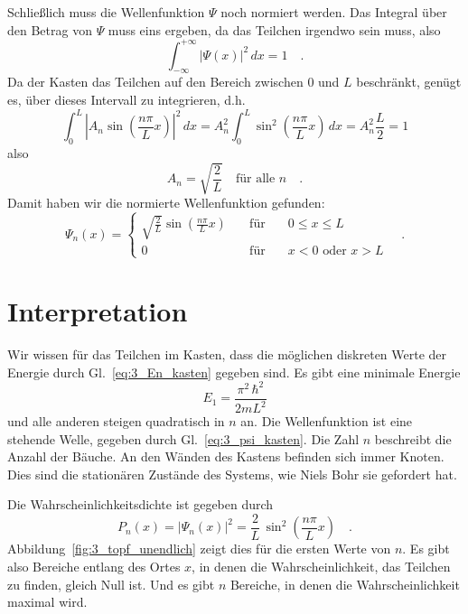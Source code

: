 Schließlich muss die Wellenfunktion $\Psi$ noch normiert werden. Das Integral über den Betrag von $\Psi$ muss eins ergeben, da das Teilchen irgendwo sein muss, also
\begin{equation}
    \int_{-\infty}^{+\infty} \left| \Psi(x) \right|^2 \,dx = 1 \quad .
\end{equation}
Da der Kasten das Teilchen auf den Bereich zwischen $0$ und $L$ beschränkt, genügt es, über dieses Intervall zu integrieren, d.h. 
\begin{equation}
    \int_0^{L} \left|  A_n \sin \left(  \frac{n\pi}{L} x \right) \right|^2 \,dx =
   A_n^2  \int_0^{L} \sin^2 \left(  \frac{n\pi}{L} x \right)  \,dx = 
   A_n^2  \frac{L}{2} = 1
\end{equation}
also
\begin{equation}
    A_n = \sqrt{\frac{2}{L}} \quad \text{für alle }n \quad .
\end{equation}
Damit haben wir die normierte Wellenfunktion gefunden:
\begin{equation}
    \Psi_n(x) = \left\{
    \begin{matrix}
        \sqrt{\frac{2}{L}}  \sin \left(  \frac{n\pi}{L} x \right) \quad &\text{für} \quad & 0 \le x \le L \\
        0  &  \text{für} &  x < 0 \text{ oder } x > L 
    \end{matrix}
    \right. \quad .
    \label{eq:3_psi_kasten}
\end{equation}

\section{Interpretation}

Wir wissen  für das Teilchen im Kasten, dass die möglichen diskreten Werte der Energie durch Gl.~\ref{eq:3_En_kasten} gegeben sind. Es gibt eine minimale Energie 
\begin{equation}
E_1 = \frac{\pi^2 \, \hbar^2}{2 m L^2}
\end{equation}
und alle anderen steigen quadratisch in $n$ an. Die Wellenfunktion ist eine stehende Welle, gegeben durch Gl.~\ref{eq:3_psi_kasten}. Die Zahl $n$ beschreibt die Anzahl der Bäuche. An den Wänden des Kastens befinden sich immer Knoten.
Dies sind die stationären Zustände des Systems, wie Niels Bohr sie gefordert hat.

Die Wahrscheinlichkeitsdichte ist gegeben durch
\begin{equation}
    P_n(x) = |\Psi_n(x)|^2 = \frac{2}{L} \, \sin^2 \left(  \frac{n\pi}{L} x \right) \quad .
    \label{eq:3_WK_kasten}
\end{equation}
Abbildung~\ref{fig:3_topf_unendlich} zeigt dies für die ersten Werte von $n$. Es gibt also Bereiche entlang des Ortes $x$, in denen die Wahrscheinlichkeit, das Teilchen zu finden, gleich Null ist. Und es gibt $n$ Bereiche, in denen die Wahrscheinlichkeit maximal wird.

